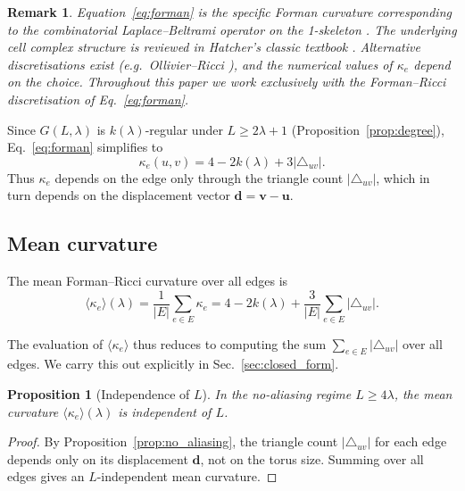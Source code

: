\documentclass[aps,pre,onecolumn,10pt,groupedaddress,amsmath,amssymb,floatfix]{revtex4-2}
\newtheorem{proposition}{Proposition}
\newtheorem{remark}{Remark}
\begin{document}
\begin{remark}
Equation~\eqref{eq:forman} is the specific Forman curvature corresponding to the combinatorial Laplace--Beltrami operator on the 1-skeleton \cite{forman2003bochner}. The underlying cell complex structure is reviewed in Hatcher's classic textbook \cite{hatcher2002algebraic}. Alternative discretisations exist (e.g.\ Ollivier--Ricci \cite{ollivier2009ricci}), and the numerical values of $\kappa_e$ depend on the choice. Throughout this paper we work exclusively with the Forman--Ricci discretisation of Eq.~\eqref{eq:forman}.
\end{remark}

Since $G(L, \lambda)$ is $k(\lambda)$-regular under $L \ge 2\lambda+1$ (Proposition~\ref{prop:degree}), Eq.~\eqref{eq:forman} simplifies to
\begin{equation}
\kappa_e(u, v) = 4 - 2k(\lambda) + 3|\triangle_{uv}|.
\label{eq:forman_reg}
\end{equation}
Thus $\kappa_e$ depends on the edge only through the triangle count $|\triangle_{uv}|$, which in turn depends on the displacement vector $\mathbf{d} = \mathbf{v} - \mathbf{u}$.

\subsection{Mean curvature}

The mean Forman--Ricci curvature over all edges is
\begin{equation}
\langle\kappa_e\rangle(\lambda) = \frac{1}{|E|}\sum_{e\in E}\kappa_e = 4 - 2k(\lambda) + \frac{3}{|E|}\sum_{e\in E}|\triangle_{uv}|.
\label{eq:mean_def}
\end{equation}

The evaluation of $\langle\kappa_e\rangle$ thus reduces to computing the sum $\sum_{e\in E}|\triangle_{uv}|$ over all edges. We carry this out explicitly in Sec.~\ref{sec:closed_form}.

\begin{proposition}[Independence of $L$]
\label{prop:indep_L}
In the no-aliasing regime $L \ge 4\lambda$, the mean curvature $\langle\kappa_e\rangle(\lambda)$ is independent of $L$.
\end{proposition}
\begin{proof}
By Proposition~\ref{prop:no_aliasing}, the triangle count $|\triangle_{uv}|$ for each edge depends only on its displacement $\mathbf{d}$, not on the torus size. Summing over all edges gives an $L$-independent mean curvature.
\end{proof}
\end{document}
